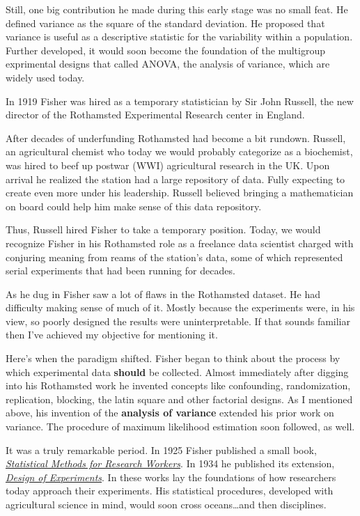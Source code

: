 \documentclass[]{book}
\begin{document}
Still, one big contribution he made during this early stage was no small feat. He defined variance as the square of the standard deviation. He proposed that variance is useful as a descriptive statistic for the variability within a population. Further developed, it would soon become the foundation of the multigroup exprimental designs that called ANOVA, the analysis of variance, which are widely used today.

In 1919 Fisher was hired as a temporary statistician by Sir John Russell, the new director of the Rothamsted Experimental Research center in England.

After decades of underfunding Rothamsted had become a bit rundown. Russell, an agricultural chemist who today we would probably categorize as a biochemist, was hired to beef up postwar (WWI) agricultural research in the UK. Upon arrival he realized the station had a large repository of data. Fully expecting to create even more under his leadership. Russell believed bringing a mathematician on board could help him make sense of this data repository.

Thus, Russell hired Fisher to take a temporary position. Today, we would recognize Fisher in his Rothamsted role as a freelance data scientist charged with conjuring meaning from reams of the station's data, some of which represented serial experiments that had been running for decades.

As he dug in Fisher saw a lot of flaws in the Rothamsted dataset. He had difficulty making sense of much of it. Mostly because the experiments were, in his view, so poorly designed the results were uninterpretable. If that sounds familiar then I've achieved my objective for mentioning it.

Here's when the paradigm shifted. Fisher began to think about the process by which experimental data \textbf{should} be collected. Almost immediately after digging into his Rothamsted work he invented concepts like confounding, randomization, replication, blocking, the latin square and other factorial designs. As I mentioned above, his invention of the \textbf{analysis of variance} extended his prior work on variance. The procedure of maximum likelihood estimation soon followed, as well.

It was a truly remarkable period. In 1925 Fisher published a small book, \href{https://psychclassics.yorku.ca/Fisher/Methods/}{\emph{Statistical Methods for Research Workers}}. In 1934 he published its extension, \href{https://www.phil.vt.edu/dmayo/PhilStatistics/b\%20Fisher\%20design\%20of\%20experiments.pdf}{\emph{Design of Experiments}}. In these works lay the foundations of how researchers today approach their experiments. His statistical procedures, developed with agricultural science in mind, would soon cross oceans\ldots{}and then disciplines.
\end{document}
